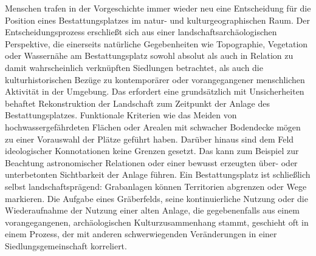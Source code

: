 \documentclass[openany,twoside,twocolumn]{book}
\begin{document}
Menschen trafen in der Vorgeschichte immer wieder neu eine Entscheidung
für die Position eines Bestattungsplatzes im natur- und
kulturgeographischen Raum. Der Entscheidungsprozess erschließt sich aus
einer landschaftsarchäologischen Perspektive, die einerseits natürliche
Gegebenheiten wie Topographie, Vegetation oder Wassernähe am
Bestattungsplatz sowohl absolut als auch in Relation zu damit
wahrscheinlich verknüpften Siedlungen betrachtet, als auch die
kulturhistorischen Bezüge zu kontemporärer oder vorangegangener
menschlichen Aktivität in der Umgebung. Das erfordert eine grundsätzlich
mit Unsicherheiten behaftet Rekonstruktion der Landschaft zum Zeitpunkt
der Anlage des Bestattungsplatzes. Funktionale Kriterien wie das Meiden
von hochwassergefährdeten Flächen oder Arealen mit schwacher Bodendecke
mögen zu einer Vorauswahl der Plätze geführt haben. Darüber hinaus sind
dem Feld ideologischer Konnotationen keine Grenzen gesetzt. Das kann zum
Beispiel zur Beachtung astronomischer Relationen oder einer bewusst
erzeugten über- oder unterbetonten Sichtbarkeit der Anlage führen. Ein
Bestattungsplatz ist schließlich selbst landschaftsprägend: Grabanlagen
können Territorien abgrenzen oder Wege markieren. Die Aufgabe eines
Gräberfelds, seine kontinuierliche Nutzung oder die Wiederaufnahme der
Nutzung einer alten Anlage, die gegebenenfalls aus einem
vorangegangenen, archäologischen Kulturzusammenhang stammt, geschieht
oft in einem Prozess, der mit anderen schwerwiegenden Veränderungen in
einer Siedlungsgemeinschaft korreliert.
\end{document}
